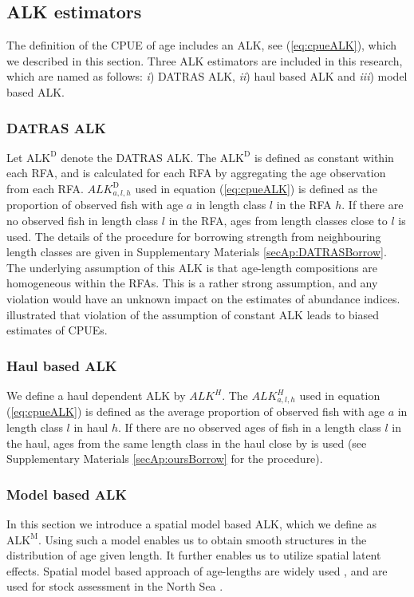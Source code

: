 \documentclass[a4paper 12pt]{article}
\numberwithin{equation}{section}
\begin{document}
\subsection{ALK estimators}
\label{sec:alkmethods}
The definition of the CPUE of age includes an ALK, see (\ref{eq:cpueALK}), which we described in this section. Three ALK estimators are included in this research, which are named as follows:  \textit{i}) DATRAS ALK, \textit{ii}) haul based ALK and \textit{iii}) model based ALK.
\subsubsection{DATRAS ALK}
\label{sec:datrasalkestimator}
Let $\text{ALK}^{\text{D}}$ denote the DATRAS ALK. The $\text{ALK}^{\text{D}}$ is defined as constant within each RFA, and is calculated for each RFA by aggregating the age observation from each RFA. $ALK^{\text{D}}_{a,l,h}$ used in equation (\ref{eq:cpueALK}) is defined as the proportion of observed fish with age $a$ in length class $l$ in the RFA $h$. If there are no observed fish in length class $l$ in the RFA, ages from length classes close to $l$ is used. The details of the procedure for borrowing strength from neighbouring length classes are given in Supplementary Materials \ref{secAp:DATRASBorrow}. The underlying assumption of this ALK  is that age-length compositions are homogeneous within the RFAs. This is a rather strong assumption, and any violation would have an unknown impact on the estimates of abundance indices. \citet{aanes2015efficient} illustrated that violation of the assumption of constant ALK leads to biased estimates of CPUEs. 

\subsubsection{Haul based ALK}
\label{sec:haulestimator}
We define a haul dependent ALK  by  $ALK^{H}$. The $ALK^{H}_{a,l,h}$  used in equation (\ref{eq:cpueALK}) is defined as the average proportion of observed fish with age $a$ in  length class $l$ in haul $h$. If there are no observed ages of fish in a length class $l$ in the haul, ages from the same length class in the haul close by is used (see Supplementary Materials \ref{secAp:oursBorrow} for the procedure).

\subsubsection{Model based ALK}
\label{sec:spatialModelALK}
In this section we introduce a spatial model based ALK, which we define as $\mathrm{ALK^M}$. Using such a model enables us to obtain smooth structures in the distribution of age given length. It further enables us to utilize spatial latent effects. Spatial model based approach of age-lengths are widely used \citep{berg2012spatial, hirst2012bayesian, rindorf2001analyses}, and are used for stock assessment in the North Sea \citep{berg2014evaluation}.  %
\end{document}
